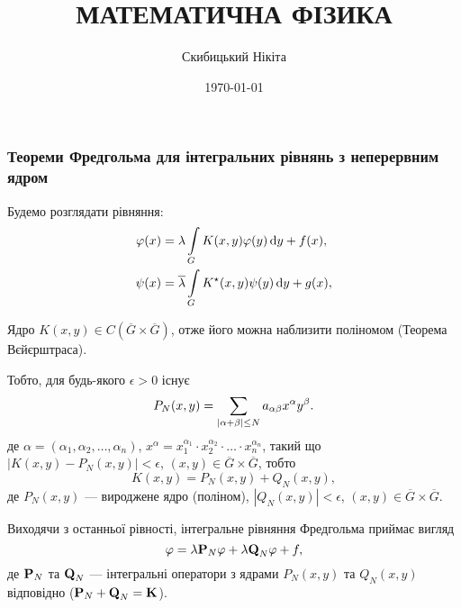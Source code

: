 

\title{{\Huge МАТЕМАТИЧНА ФІЗИКА}}
\author{Скибицький Нікіта}
\date{\today}





\tableofcontents

% 
% 

\setcounter{section}{2}
\setcounter{subsection}{2}
\setcounter{subsubsection}{1}
\setcounter{theorem}{9}
\setcounter{equation}{28}

\subsubsection{Теореми Фредгольма для інтегральних рівнянь з неперервним ядром}

Будемо розглядати рівняння:
\begin{align}
	\phi(x) &= \lambda \Int_G K(x, y) \phi(y) \diff y + f(x), \\
	\psi(x) &= \overline \lambda \Int_G K^\star (x, y) \psi(y) \diff y + g(x),
\end{align}

Ядро $K(x, y) \in C\left(\overline G \times \overline G\right)$, отже його можна наблизити поліномом (Теорема Вєйєрштраса). \medskip

Тобто, для будь-якого $\epsilon > 0$ існує 
\begin{equation}
	P_N(x, y) = \Sum_{|\alpha + \beta| \le N} a_{\alpha\beta}x^\alpha y^\beta.
\end{equation}
де $\alpha = (\alpha_1, \alpha_2, \ldots, \alpha_n)$, $x^\alpha = x_1^{\alpha_1} \cdot x_2^{\alpha_2} \cdot \ldots \cdot x_n^{\alpha_n}$, такий що $|K(x, y) - P_N(x, y)| < \epsilon$, $(x, y) \in \overline G \times \overline G$, тобто 
\begin{equation}
	K(x, y) = P_N(x, y) + Q_N(x, y),
\end{equation}
де $P_N(x,y)$ --- вироджене ядро (поліном), $|Q_N(x, y)| < \epsilon$, $(x, y) \in \overline G \times \overline G$. \medskip

Виходячи з останньої рівності, інтегральне рівняння Фредгольма приймає вигляд 
\begin{equation}
	\phi = \lambda \bf{P}_N \phi + \lambda \bf{Q}_N \phi + f,
\end{equation}
де $\bf{P}_N$ та $\bf{Q}_N$ --- інтегральні оператори з ядрами $P_N(x, y)$ та $Q_N(x, y)$ відповідно ($\bf{P}_N + \bf{Q}_N = \bf{K}$). \medskip

